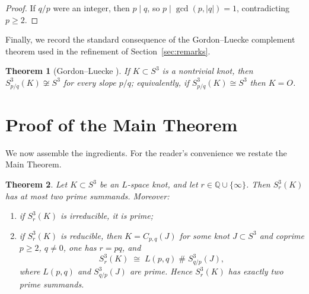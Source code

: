 \documentclass[11pt]{article}
\newtheorem{theorem}{Theorem}[section]
\theoremstyle{definition}
\theoremstyle{remark}
\numberwithin{equation}{section}
\begin{document}
\begin{proof}
If $q/p$ were an integer, then $p\mid q$, so $p\mid\gcd(p,|q|)=1$,
contradicting $p\ge2$.
\end{proof}

Finally, we record the standard consequence of the Gordon--Luecke
complement theorem used in the refinement of
Section~\ref{sec:remarks}.

\begin{theorem}[Gordon--Luecke {\cite{GL89}}]\label{thm:GL}
If $K\subset S^{3}$ is a nontrivial knot, then $S^{3}_{p/q}(K)\not\cong
S^{3}$ for every slope $p/q$; equivalently, if $S^{3}_{p/q}(K)\cong
S^{3}$ then $K=O$.
\end{theorem}

\section{Proof of the Main Theorem}\label{sec:proof}

We now assemble the ingredients.  For the reader's convenience we
restate the Main Theorem.

\begin{theorem}\label{thm:main}
Let $K\subset S^{3}$ be an $L$-space knot, and let $r\in
\mathbb{Q}\cup\{\infty\}$.  Then $S^{3}_{r}(K)$ has at most two prime
summands.  Moreover:
\begin{enumerate}
\item[(i)] if $S^{3}_{r}(K)$ is irreducible, it is prime;
\item[(ii)] if $S^{3}_{r}(K)$ is reducible, then $K=C_{p,q}(J)$ for some
knot $J\subset S^{3}$ and coprime $p\ge2$, $q\neq0$, one has $r=pq$, and
\[
S^{3}_{r}(K)\;\cong\;L(p,q)\;\#\;S^{3}_{q/p}(J),
\]
where $L(p,q)$ and $S^{3}_{q/p}(J)$ are prime.  Hence $S^{3}_{r}(K)$
has exactly two prime summands.
\end{enumerate}
\end{theorem}
\end{document}
